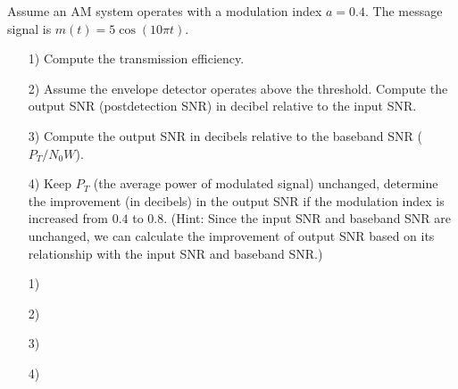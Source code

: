 \documentclass{assignment}
\begin{document}
\begin{prob}
    Assume an AM system operates with a modulation index $a=0.4$. The message signal is $m(t)=5\cos(10\pi t)$.
    \begin{itemize}
        \item[1)] Compute the transmission efficiency.
        \item[2)] Assume the envelope detector operates above the threshold. Compute the output SNR (postdetection SNR) in decibel relative to the input SNR.
        \item[3)] Compute the output SNR in decibels relative to the baseband SNR ($P_T/N_0W$).
        \item[4)] Keep $P_T$ (the average power of modulated signal) unchanged, determine the improvement (in decibels) in the output SNR if the modulation index is increased from $0.4$ to $0.8$. (Hint: Since the input SNR and baseband SNR are unchanged, we can calculate the improvement of output SNR based on its relationship with the input SNR and baseband SNR.)
    \end{itemize}
\end{prob}
\begin{sol}
    \begin{itemize}
        \item[1)] 
        \item[2)] 
        \item[3)] 
        \item[4)] 
    \end{itemize}
\end{sol}
\end{document}
